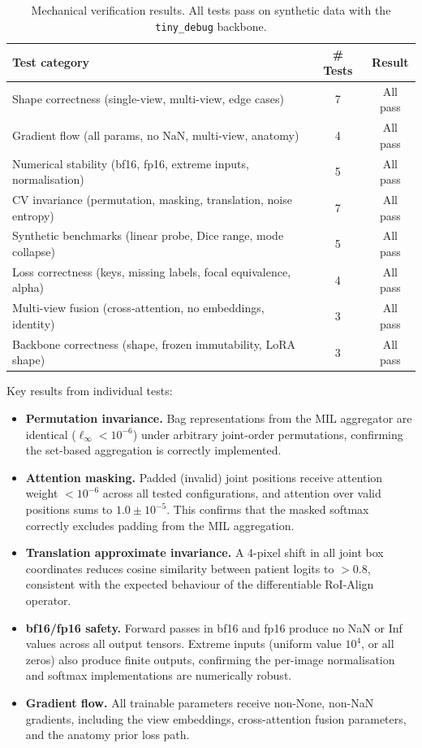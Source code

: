 \documentclass{article}
\begin{document}
\begin{table}[h]
\centering
\caption{Mechanical verification results. All tests pass on synthetic data with the \texttt{tiny\_debug} backbone.}
\label{tab:mechanical}
\begin{tabular}{@{}lcc@{}}
\toprule
\textbf{Test category} & \textbf{\# Tests} & \textbf{Result} \\
\midrule
Shape correctness (single-view, multi-view, edge cases) & 7 & All pass \\
Gradient flow (all params, no NaN, multi-view, anatomy) & 4 & All pass \\
Numerical stability (bf16, fp16, extreme inputs, normalisation) & 5 & All pass \\
CV invariance (permutation, masking, translation, noise entropy) & 7 & All pass \\
Synthetic benchmarks (linear probe, Dice range, mode collapse) & 5 & All pass \\
Loss correctness (keys, missing labels, focal equivalence, alpha) & 4 & All pass \\
Multi-view fusion (cross-attention, no embeddings, identity) & 3 & All pass \\
Backbone correctness (shape, frozen immutability, LoRA shape) & 3 & All pass \\
\bottomrule
\end{tabular}
\end{table}

Key results from individual tests:
\begin{itemize}
  \item \textbf{Permutation invariance.} Bag representations from the MIL aggregator are identical ($\ell_\infty < 10^{-6}$) under arbitrary joint-order permutations, confirming the set-based aggregation is correctly implemented.
  \item \textbf{Attention masking.} Padded (invalid) joint positions receive attention weight $<10^{-6}$ across all tested configurations, and attention over valid positions sums to $1.0 \pm 10^{-5}$. This confirms that the masked softmax correctly excludes padding from the MIL aggregation.
  \item \textbf{Translation approximate invariance.} A 4-pixel shift in all joint box coordinates reduces cosine similarity between patient logits to $>$0.8, consistent with the expected behaviour of the differentiable RoI-Align operator.
  \item \textbf{bf16/fp16 safety.} Forward passes in bf16 and fp16 produce no NaN or Inf values across all output tensors. Extreme inputs (uniform value $10^4$, or all zeros) also produce finite outputs, confirming the per-image normalisation and softmax implementations are numerically robust.
  \item \textbf{Gradient flow.} All trainable parameters receive non-None, non-NaN gradients, including the view embeddings, cross-attention fusion parameters, and the anatomy prior loss path.
\end{itemize}
\end{document}
